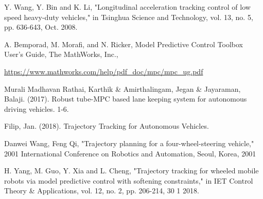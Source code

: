 \documentclass[conference,11pt]{IEEEtran}
\begin{document}
\begin{thebibliography}{00}
	
	Y. Wang, Y. Bin and K. Li, "Longitudinal acceleration tracking control of low speed heavy-duty vehicles," in Tsinghua Science and Technology, vol. 13, no. 5, pp. 636-643, Oct. 2008.
	
	A. Bemporad, M. Morafi, and N. Ricker, Model Predictive Control Toolbox User’s Guide, The MathWorks, Inc.,
	
		\url{https://www.mathworks.com/help/pdf_doc/mpc/mpc_ug.pdf}
		
	
	
	
	
	
	
	Murali Madhavan Rathai, Karthik \& Amirthalingam, Jegan \& Jayaraman, Balaji. (2017). Robust tube-MPC based lane keeping system for autonomous driving vehicles. 1-6.
	
	
	
	
	
	Filip, Jan. (2018). Trajectory Tracking for Autonomous Vehicles.
	
	Danwei Wang, Feng Qi, "Trajectory planning for a four-wheel-steering vehicle," 2001 International Conference on Robotics and Automation, Seoul, Korea, 2001
	
	H. Yang, M. Guo, Y. Xia and L. Cheng, "Trajectory tracking for wheeled mobile robots via model predictive control with softening constraints," in IET Control Theory \& Applications, vol. 12, no. 2, pp. 206-214, 30 1 2018.
\end{thebibliography}
\end{document}

